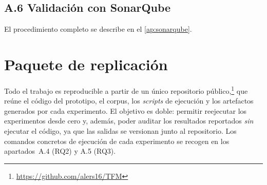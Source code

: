 \section*{A.6 Validación con SonarQube}
El procedimiento completo se describe en el \autoref{ap:sonarqube}.

\chapter{Paquete de replicación}
\label{ap:replicacion}
Todo el trabajo es reproducible a partir de un único repositorio
público,\footnote{\url{https://github.com/alers16/TFM}} que reúne el código del
prototipo, el corpus, los \emph{scripts} de ejecución y los artefactos generados
por cada experimento. El objetivo es doble: permitir reejecutar los experimentos
desde cero y, además, poder auditar los resultados reportados \emph{sin} ejecutar
el código, ya que las salidas se versionan junto al repositorio. Los comandos
concretos de ejecución de cada experimento se recogen en los apartados~A.4 (RQ2)
y A.5 (RQ3).

